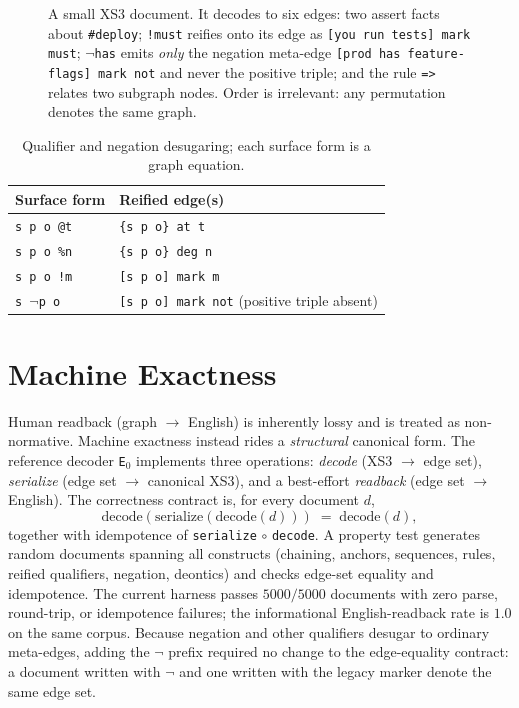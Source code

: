 \documentclass[conference]{IEEEtran}
\newcommand{\code}[1]{\texttt{#1}}
\begin{document}
\begin{figure}[t]
\centering
{}
\caption{A small XS3 document. It decodes to six edges: two assert facts about
\texttt{\#deploy}; \texttt{!must} reifies onto its edge as
\texttt{[you run tests] mark must}; \texttt{$\neg$has} emits \emph{only} the
negation meta-edge \texttt{[prod has feature-flags] mark not} and never the
positive triple; and the rule \texttt{=\textgreater} relates two subgraph nodes.
Order is irrelevant: any permutation denotes the same graph.}
\label{fig:example}
\end{figure}

\begin{table}[t]
\caption{Qualifier and negation desugaring; each surface form is a graph equation.}
\label{tab:desugar}
\centering\small
\begin{tabular}{@{}ll@{}}
\toprule
Surface form & Reified edge(s) \\
\midrule
\texttt{s p o @t}    & \texttt{\{s p o\} at t} \\
\texttt{s p o \%n}   & \texttt{\{s p o\} deg n} \\
\texttt{s p o !m}    & \texttt{[s p o] mark m} \\
\texttt{s $\neg$p o} & \texttt{[s p o] mark not} \quad(positive triple absent) \\
\bottomrule
\end{tabular}
\end{table}

\section{Machine Exactness}\label{sec:exact}
Human readback (graph $\rightarrow$ English) is inherently lossy and is treated
as non-normative. Machine exactness instead rides a \emph{structural} canonical
form. The reference decoder \code{E$_0$} implements three operations:
\emph{decode} (XS3 $\rightarrow$ edge set), \emph{serialize} (edge set
$\rightarrow$ canonical XS3), and a best-effort \emph{readback} (edge set
$\rightarrow$ English). The correctness contract is, for every document $d$,
\[
\text{decode}(\text{serialize}(\text{decode}(d))) \;=\; \text{decode}(d),
\]
together with idempotence of \code{serialize}$\,\circ\,$\code{decode}. A property
test generates random documents spanning all constructs (chaining, anchors,
sequences, rules, reified qualifiers, negation, deontics) and checks edge-set
equality and idempotence. The current harness passes $5000/5000$ documents with
zero parse, round-trip, or idempotence failures; the informational
English-readback rate is $1.0$ on the same corpus. Because negation and other
qualifiers desugar to ordinary meta-edges, adding the $\neg$ prefix required no
change to the edge-equality contract: a document written with $\neg$ and one
written with the legacy marker denote the same edge set.
\end{document}
